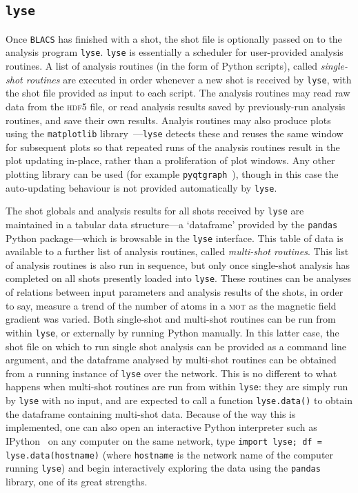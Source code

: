 \subsection{\texttt{lyse}}

Once \texttt{BLACS} has finished with a shot, the shot file is optionally passed on to the analysis program \texttt{lyse}. \texttt{lyse} is essentially a scheduler for user-provided analysis routines. A list of analysis routines (in the form of Python scripts), called \emph{single-shot routines} are executed in order whenever a new shot is received by \texttt{lyse}, with the shot file provided as input to each script. The analysis routines may read raw data from the \textsc{hdf5} file, or read analysis results saved by previously-run analysis routines, and save their own results. Analyis routines may also produce plots using the \texttt{matplotlib} library~\cite{Hunter:2007}---\texttt{lyse} detects these and reuses the same window for subsequent plots so that repeated runs of the analysis routines result in the plot updating in-place, rather than a proliferation of plot windows. Any other plotting library can be used (for example \texttt{pyqtgraph}~\cite{campagnola_pyqtgraph_2016}), though in this case the auto-updating behaviour is not provided automatically by \texttt{lyse}.

The shot globals and analysis results for all shots received by \texttt{lyse} are maintained in a tabular data structure---a `dataframe' provided by the \texttt{pandas}~\cite{mckinney-proc-scipy-2010} Python package---which is browsable in the \texttt{lyse} interface. This table of data is available to a further list of analysis routines, called \emph{multi-shot routines}. This list of analysis routines is also run in sequence, but only once single-shot analysis has completed on all shots presently loaded into \texttt{lyse}. These routines can be analyses of relations between input parameters and analysis results of the shots, in order to say, measure a trend of the number of atoms in a \textsc{mot} as the magnetic field gradient was varied. Both single-shot and multi-shot routines can be run from within \texttt{lyse}, or externally by running Python manually. In this latter case, the shot file on which to run single shot analysis can be provided as a command line argument, and the dataframe analysed by multi-shot routines can be obtained from a running instance of \texttt{lyse} over the network. This is no different to what happens when multi-shot routines are run from within \texttt{lyse}: they are simply run by \texttt{lyse} with no input, and are expected to call a function \texttt{lyse.data()} to obtain the dataframe containing multi-shot data. Because of the way this is implemented, one can also open an interactive Python interpreter such as IPython~\cite{perez_ipython:_2007} on any computer on the same network, type \texttt{import lyse; df = lyse.data(hostname)} (where \texttt{hostname} is the network name of the computer running \texttt{lyse}) and begin interactively exploring the data using the \texttt{pandas} library, one of its great strengths.

